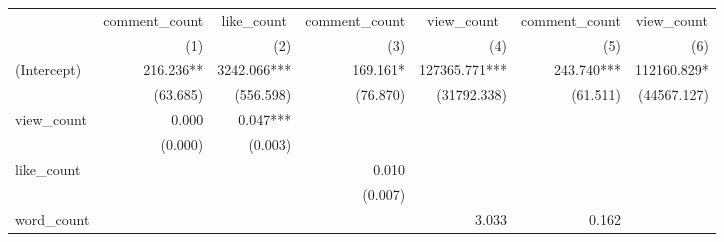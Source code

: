 \begin{tabular}{lrrrrrr}
\toprule
                  & \multicolumn{1}{c}{comment\_count} & \multicolumn{1}{c}{like\_count} & \multicolumn{1}{c}{comment\_count} & \multicolumn{1}{c}{view\_count} & \multicolumn{1}{c}{comment\_count} & \multicolumn{1}{c}{view\_count} \\ 
\cmidrule(lr){2-2} \cmidrule(lr){3-3} \cmidrule(lr){4-4} \cmidrule(lr){5-5} \cmidrule(lr){6-6} \cmidrule(lr){7-7} 
                  &                                (1) &                             (2) &                                (3) &                             (4) &                                (5) &                             (6) \\ 
\midrule
(Intercept)       &                          216.236** &                     3242.066*** &                           169.161* &                   127365.771*** &                         243.740*** &                     112160.829* \\ 
                  &                           (63.685) &                       (556.598) &                           (76.870) &                     (31792.338) &                           (61.511) &                     (44567.127) \\ 
view\_count       &                              0.000 &                        0.047*** &                                    &                                 &                                    &                                 \\ 
                  &                            (0.000) &                         (0.003) &                                    &                                 &                                    &                                 \\ 
like\_count       &                                    &                                 &                              0.010 &                                 &                                    &                                 \\ 
                  &                                    &                                 &                            (0.007) &                                 &                                    &                                 \\ 
word\_count       &                                    &                                 &                                    &                           3.033 &                              0.162 &                                 \\ 

\end{tabular}

